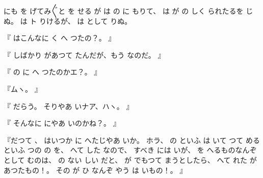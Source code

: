にも
を
げてみ〴〵と
を
せる
が
は
の
に
もりて、
は
が
の
しく
られたるを
じぬ。
は
ト
りけるが、
は
として
りぬ。

『
はこんなに
く
へ
つたの？。
』

『
しばかり
があつて
たんだが、もう
なのだ。
』

『
の
に
へ
つたのかエ？。
』

『ムヽ。
』

『
だらう。
そりやあ
いナア、ハヽ。
』

『
そんなに
にやあ
いのかね？。
』

『だつて
、
はいつか
に
へたじやあ
いか。
ホラ、
の
といふ
は
いて
つて
めるといふ
つの
の
を、
へて
した
なので、
すべき
には
いが、
を
へるものなんぞとして
むのは、
の
ない
しい
だと、
が
でもつて
まうとしたら、
へて
れた
があつたもの！。
その
が
ひ
なんぞ
やう
は
いもの！。
』

